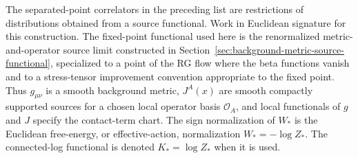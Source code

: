 The separated-point correlators in the preceding list are restrictions of
distributions obtained from a source functional.  Work in Euclidean signature
for this construction.  The fixed-point functional used here is the
renormalized metric-and-operator source limit constructed in
Section~\ref{sec:background-metric-source-functional}, specialized to a point
of the RG flow where the beta functions vanish and to a stress-tensor
improvement convention appropriate to the fixed point.  Thus \(g_{\mu\nu}\) is
a smooth background metric, \(J^A(x)\) are smooth compactly supported
sources for a chosen local operator basis \(\mathcal O_A\), and local
functionals of \(g\) and \(J\) specify the contact-term chart.  The sign
normalization of \(W_\ast\) is the Euclidean free-energy, or effective-action,
normalization \(W_\ast=-\log Z_\ast\).  The connected-log functional is denoted
\(K_\ast=\log Z_\ast\) when it is used.

